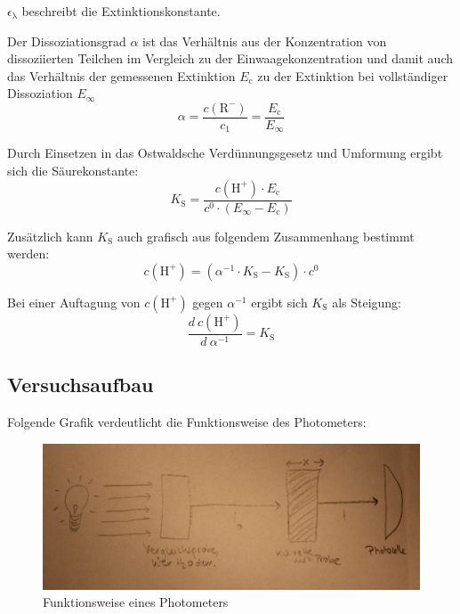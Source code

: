 \documentclass[12pt,a4paper,titlepage,headinclude,bibtotoc]{scrartcl}
\begin{document}
$\epsilon_\mathrm{\lambda}$ beschreibt die Extinktionskonstante. 

Der Dissoziationsgrad $\alpha$ ist das Verhältnis aus der Konzentration von dissoziierten Teilchen im Vergleich zu der Einwaagekonzentration und damit auch das Verhältnis der gemessenen Extinktion $E_\mathrm{c}$ zu der Extinktion bei vollständiger Dissoziation $E_\infty$\\

\begin{equation}
\alpha = \frac{c(\mathrm{R^-})}{c_1} = \frac{E_\mathrm{c}}{E_\infty}
\end{equation}

Durch Einsetzen in das Ostwaldsche Verdünnungsgesetz und Umformung  ergibt sich die Säurekonstante:\\

\begin{equation}
K_\mathrm{S} =\frac{c( \mathrm{H} ^+) \cdot E_\mathrm{c}}{c^0 \cdot (E_\infty - E_\mathrm{c})}
\end{equation}

Zusätzlich kann $K_\mathrm{S}$ auch grafisch aus folgendem Zusammenhang bestimmt werden:\\

\begin{equation}
c(\mathrm{H}^+) = (\alpha^{-1} \cdot K_\mathrm{S} - K_\mathrm{S}) \cdot c^0
\end{equation}

Bei einer Auftagung von $c( \mathrm{H}^+)$ gegen $\alpha^{-1}$ ergibt sich $K_\mathrm{S}$ als Steigung:\\

\begin{equation}
\frac{d{~}c(\mathrm{H^+})}{d{~}\alpha^{-1}} = K_\mathrm{S}
\end{equation}

\subsection{Versuchsaufbau}

Folgende Grafik verdeutlicht die Funktionsweise des Photometers:

\begin{figure} [h!]
\begin{center}
\includegraphics[scale=0.6]{Photometer.png} \end{center}
\caption {Funktionsweise eines Photometers}
\end{figure}
\end{document}
